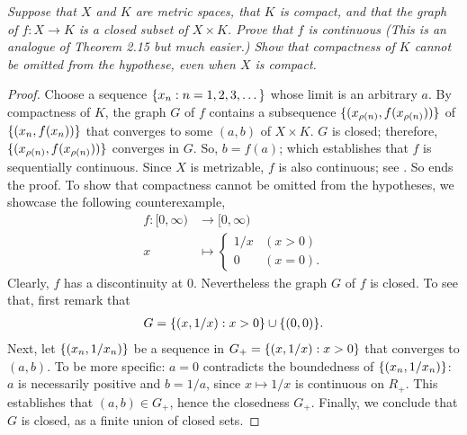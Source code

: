 \textit{%
Suppose that $X$ and $K$ are metric spaces, %
that $K$ is compact, and that the graph of %
%
  $f:X\to K$ %
%
is a closed subset of $X\times K$. %
Prove that $f$ is continuous %
%
  (This is an analogue of Theorem 2.15 but much easier.) %
%
Show that compactness of $K$ cannot be omitted from the hypothese, %
even when $X$ is compact.
}
%
\begin{proof}%
Choose a sequence $\{x_n: n=1, 2, 3, \dots\}$ whose limit is an arbitrary $a$. %
By compactness of $K$, the graph $G$ of $f$ contains a subsequence %
%
  $\{
    (x_{\rho(n)}, f(x_{\rho(n)}))
  \}$
%
of %
%
  $\{
    (x_n, f(x_n))
  \}$
%
that converges to some $(a, b)$ of $X\times K$. %
$G$ is closed; therefore, $\{(x_{\rho(n)}, f(x_{\rho(n)}))\}$
converges in $G$. So, $b=f(a)$; %
which establishes that $f$ is sequentially continuous.
%
Since $X$ is metrizable, $f$ is also continuous; see \citeresultFA{[A6]}. %
So ends the proof.
%
\newline\newline\noindent %
%
To show that compactness cannot be omitted from the hypotheses, %
we showcase the following counterexample, %
%
  \begin{align}
  f: [0, \infty) & \to [0, \infty)\\
     x & \mapsto\begin{cases}
       1/x & (x > 0)  \\\nonumber
       0   & (x = 0).
    \end{cases}
  \end{align}
%
Clearly, $f$ has a discontinuity at $0$. %
Nevertheless the graph $G$ of $f$ is closed. %
To see that, first remark that %
%
  \begin{align}
    G = \{(x, 1/x): x > 0\} \cup \{(0, 0)\}.
  \end{align}
%
Next, let %
%
  $\{(x_n, 1/x_n)\}$ %
%
be a sequence in %
%
  $G_+ = \{(x, 1/x): x > 0\}$ %
%
that converges to $(a, b)$. %
To be more specific: %
$a=0$ contradicts the boundedness of $\{(x_n,1/x_n)\}$: %
$a$ is necessarily positive and $b = 1/a$, %
since $x\mapsto 1/x$ is continuous on $R_+$.
This establishes that $(a, b) \in G_+$, hence the closedness $G_+$. %
Finally, we conclude that $G$ is closed, as a finite union of closed sets.
%
\end{proof}
%
